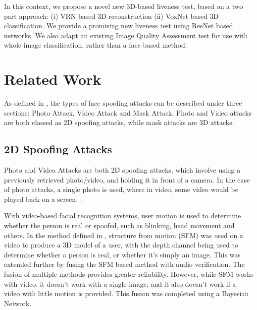 \documentclass[11pt,a4paper]{article}
\begin{document}
    In this context, we propose a novel new 3D-based liveness test, based on a two part approach: (i) VRN based 3D reconstruction (ii) VoxNet based 3D classification.
    We provide a promising new liveness test using ResNet based networks. We also adapt an existing Image Quality Assessment test for use with whole image classification, rather
    than a face based method.

\section{Related Work}
    As defined in \cite{FaceSpoofingAttacksStudy}, the types of face spoofing attacks can be described under three sections: Photo Attack, Video Attack and Mask Attack.
    Photo and Video attacks are both classed as 2D spoofing attacks, while mask attacks are 3D attacks.

    \subsection{2D Spoofing Attacks}
        Photo and Video Attacks are both 2D spoofing attacks, which involve using a previously retrieved photo/video, and holding it in front of a camera. In the case of photo attacks,
        a single photo is used, where in video, some video would be played back on a screen. \cite{FaceSpoofingAttacksStudy}.

        With video-based facial recognition systems, user motion is used to determine whether the person is real or spoofed, such as blinking, head movement and others.
        In the method defined in \cite{SFMClassifier}, structure from motion (SFM) was used on a video to produce a 3D model of a user, with the depth channel being used to determine whether a person is real, or whether it's simply an image.
        This was extended further by fusing the SFM based method with audio verification. The fusion of multiple methods provides greater reliability. However, while SFM works with video, it doesn't work with a single image,
        and it also doesn't work if a video with little motion is provided. This fusion was completed using a Bayesian Network.
\end{document}
